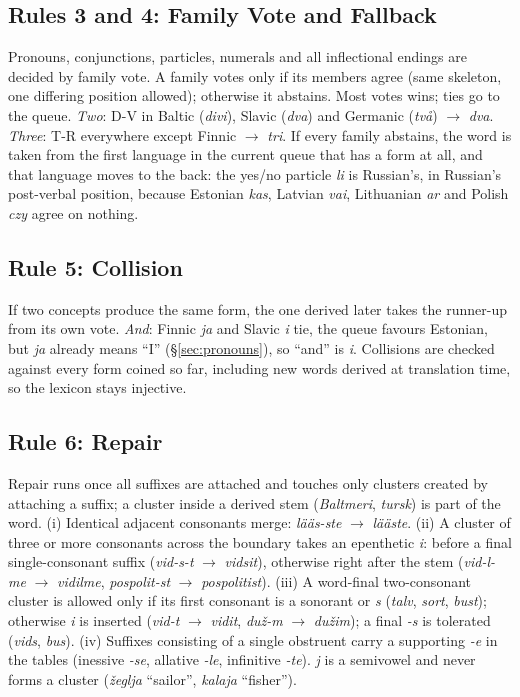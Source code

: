 \subsection{Rules 3 and 4: Family Vote and Fallback}
Pronouns, conjunctions, particles, numerals and all inflectional endings are decided by family vote. A family votes only if its members agree (same skeleton, one differing position allowed); otherwise it abstains. Most votes wins; ties go to the queue. \emph{Two}: D-V in Baltic (\emph{divi}), Slavic (\emph{dva}) and Germanic (\emph{två}) $\rightarrow$ \emph{dva}. \emph{Three}: T-R everywhere except Finnic $\rightarrow$ \emph{tri}. If every family abstains, the word is taken from the first language in the current queue that has a form at all, and that language moves to the back: the yes/no particle \emph{li} is Russian's, in Russian's post-verbal position, because Estonian \emph{kas}, Latvian \emph{vai}, Lithuanian \emph{ar} and Polish \emph{czy} agree on nothing.

\subsection{Rule 5: Collision}
If two concepts produce the same form, the one derived later takes the runner-up from its own vote. \emph{And}: Finnic \emph{ja} and Slavic \emph{i} tie, the queue favours Estonian, but \emph{ja} already means ``I'' (\S\ref{sec:pronouns}), so ``and'' is \emph{i}. Collisions are checked against every form coined so far, including new words derived at translation time, so the lexicon stays injective.

\subsection{Rule 6: Repair}\label{sec:repair}
Repair runs once all suffixes are attached and touches only clusters created by attaching a suffix; a cluster inside a derived stem (\emph{Baltmeri}, \emph{tursk}) is part of the word. (i) Identical adjacent consonants merge: \emph{lääs-ste} $\rightarrow$ \emph{lääste}. (ii) A cluster of three or more consonants across the boundary takes an epenthetic \emph{i}: before a final single-consonant suffix (\emph{vid-s-t} $\rightarrow$ \emph{vidsit}), otherwise right after the stem (\emph{vid-l-me} $\rightarrow$ \emph{vidilme}, \emph{pospolit-st} $\rightarrow$ \emph{pospolitist}). (iii) A word-final two-consonant cluster is allowed only if its first consonant is a sonorant or \emph{s} (\emph{talv}, \emph{sort}, \emph{bust}); otherwise \emph{i} is inserted (\emph{vid-t} $\rightarrow$ \emph{vidit}, \emph{duž-m} $\rightarrow$ \emph{dužim}); a final \emph{-s} is tolerated (\emph{vids}, \emph{bus}). (iv) Suffixes consisting of a single obstruent carry a supporting \emph{-e} in the tables (inessive \emph{-se}, allative \emph{-le}, infinitive \emph{-te}). \emph{j} is a semivowel and never forms a cluster (\emph{žeglja} ``sailor'', \emph{kalaja} ``fisher'').

